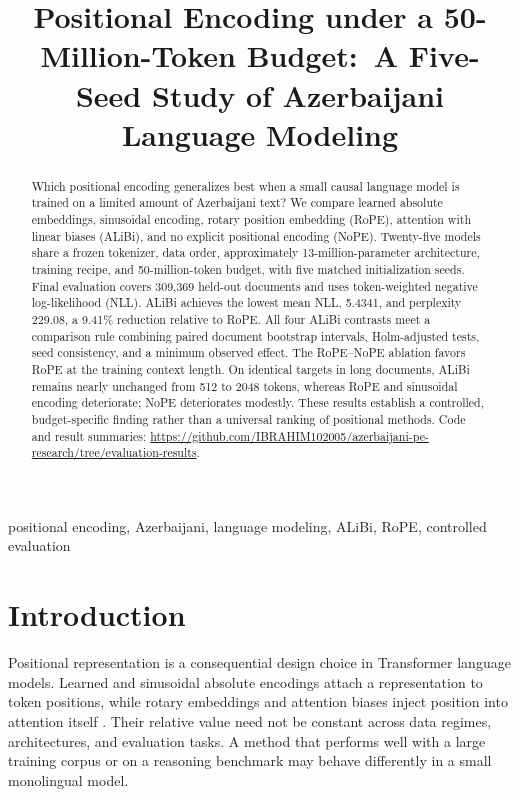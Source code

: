 \documentclass[conference]{IEEEtran}
\title{Positional Encoding under a 50-Million-Token Budget:\
A Five-Seed Study of Azerbaijani Language Modeling}
\begin{document}
\maketitle

\begin{abstract}
Which positional encoding generalizes best when a small causal language model is trained on a limited amount of Azerbaijani text? We compare learned absolute embeddings, sinusoidal encoding, rotary position embedding (RoPE), attention with linear biases (ALiBi), and no explicit positional encoding (NoPE). Twenty-five models share a frozen tokenizer, data order, approximately 13-million-parameter architecture, training recipe, and 50-million-token budget, with five matched initialization seeds. Final evaluation covers 309,369 held-out documents and uses token-weighted negative log-likelihood (NLL). ALiBi achieves the lowest mean NLL, 5.4341, and perplexity 229.08, a 9.41\% reduction relative to RoPE. All four ALiBi contrasts meet a comparison rule combining paired document bootstrap intervals, Holm-adjusted tests, seed consistency, and a minimum observed effect. The RoPE--NoPE ablation favors RoPE at the training context length. On identical targets in long documents, ALiBi remains nearly unchanged from 512 to 2048 tokens, whereas RoPE and sinusoidal encoding deteriorate; NoPE deteriorates modestly. These results establish a controlled, budget-specific finding rather than a universal ranking of positional methods. Code and result summaries: \url{https://github.com/IBRAHIM102005/azerbaijani-pe-research/tree/evaluation-results}.
\end{abstract}

\begin{IEEEkeywords}
positional encoding, Azerbaijani, language modeling, ALiBi, RoPE, controlled evaluation
\end{IEEEkeywords}

\section{Introduction}
Positional representation is a consequential design choice in Transformer language models. Learned and sinusoidal absolute encodings attach a representation to token positions, while rotary embeddings and attention biases inject position into attention itself \cite{vaswani,su,press}. Their relative value need not be constant across data regimes, architectures, and evaluation tasks. A method that performs well with a large training corpus or on a reasoning benchmark may behave differently in a small monolingual model.
\end{document}

